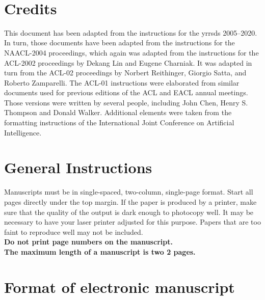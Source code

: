\documentclass[10pt, a4paper]{article}
\begin{document}

{}\\[1cm]

\section{Credits}
\label{sec:credits}

This document has been adapted from the instructions for the \ac{yrrsds} 2005--2020.
In turn, those documents have been adapted from the instructions for the NAACL-2004 proceedings, which again was adapted from the instructions for the ACL-2002 proceedings by Dekang Lin and Eugene Charniak.
It was adapted in turn from the ACL-02 proceedings by Norbert Reithinger, Giorgio Satta, and Roberto Zamparelli.
The ACL-01 instructions were elaborated from similar documents used for previous editions of the ACL and EACL annual meetings.
Those versions were written by several people, including John Chen, Henry S. Thompson and Donald Walker.
Additional elements were taken from the formatting instructions of the International Joint Conference on Artificial Intelligence.

\section{General Instructions}
\label{sec:general_instructions}

Manuscripts must be in single-spaced, two-column, single-page format.
Start all pages directly under the top margin.
If the paper is produced by a printer, make sure that the quality of the output
is dark enough to photocopy well. It may be necessary to have your laser
printer adjusted for this purpose. Papers that are too faint to reproduce well
may not be included.\\
\textbf{Do not print page numbers on the manuscript.}\\
\textbf{The maximum length of a manuscript is two 2 pages.}

\section{Format of electronic manuscript}
\label{sec:format_of_electronic_manusript}
\end{document}

